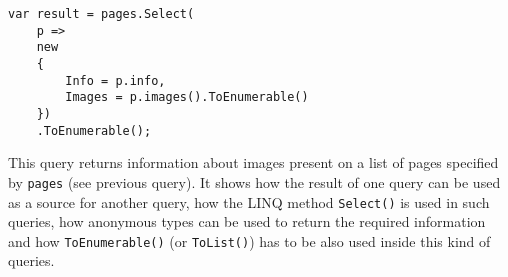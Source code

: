 \begin{lstlisting}
var result = pages.Select(
	p =>
	new
	{
		Info = p.info,
		Images = p.images().ToEnumerable()
	})
	.ToEnumerable();
\end{lstlisting}

This query returns information about images present on a list of pages specified by \lstinline{pages}
(see previous query).
It shows how the result of one query can be used as a source for another query,
how the LINQ method \lstinline{Select()} is used in such queries,
how anonymous types can be used to return the required information
and how \lstinline{ToEnumerable()} (or \lstinline{ToList()}) has to be also used inside this kind of queries.
